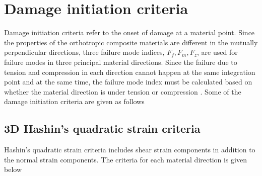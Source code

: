 \documentclass[12pt,openright,twoside]{report}
\begin{document}
\section{Damage initiation criteria}
\indent\indent\indent   Damage initiation criteria refer to the onset of damage at a material point. Since the properties of the orthotropic composite materials are different in the mutually perpendicular directions, three failure mode indices, $F_{f}, F_{m}, F_{z}$, are used for failure modes in three principal material directions. Since the failure due to tension and compression in each direction cannot happen at the same integration point and at the same time, the failure mode index must be calculated based on whether the material direction is under tension or compression \citep{wang2009three}. Some of the damage initiation criteria are given as follows

\subsection{3D Hashin's quadratic strain criteria}\label{3D Hashin's quadratic strain criteria }
\indent\indent\indent Hashin's quadratic strain criteria \citep{wang2009three} includes shear strain components in addition to the normal strain components. The criteria for each material direction is given below 
\end{document}
